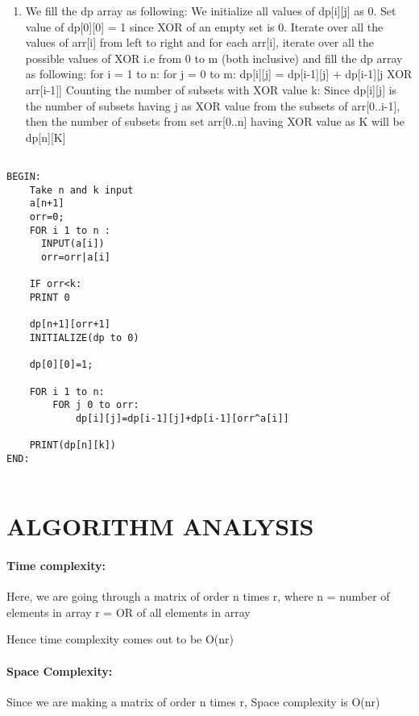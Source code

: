 \documentclass[10pt]{article}
\begin{document}
\begin{multicols*}{2}
\begin{enumerate}
\item	We fill the dp array as following:
We initialize all values of dp[i][j] as 0.
Set value of dp[0][0] = 1 since XOR of an empty set is 0.
Iterate over all the values of arr[i] from left to right and for each arr[i], iterate over all the possible values of XOR i.e from 0 to m (both inclusive) and fill the dp array as following:
   	for i = 1 to n:
             for j = 0 to m:
                   dp[i][j] = dp[i­-1][j] + dp[i­-1][j XOR arr[i-1]]
Counting the number of subsets with XOR value k: Since dp[i][j] is the number of subsets having j as XOR value from the subsets of arr[0..i-1], then the number of subsets from set arr[0..n] having XOR value as K will be dp[n][K]


\end{enumerate}



\begin{lstlisting}
        
BEGIN:
	Take n and k input
	a[n+1]
	orr=0;
	FOR i 1 to n :
      INPUT(a[i])
      orr=orr|a[i]

	IF orr<k:
  	PRINT 0
  	
    dp[n+1][orr+1]
    INITIALIZE(dp to 0)
	
    dp[0][0]=1;
	
	FOR i 1 to n:
    	FOR j 0 to orr:
            dp[i][j]=dp[i-1][j]+dp[i-1][orr^a[i]]
           
    PRINT(dp[n][k])
END:


\end{lstlisting}
    

	
\section*{ALGORITHM ANALYSIS} 


\paragraph{Time complexity:} Here, we are going through a matrix of order n times r, where
	n = number of elements in array
r = OR of all elements in array 

Hence time complexity comes out to be O(nr)
\\

\paragraph{Space Complexity:} Since we are making a matrix of order n times r,
Space complexity is O(nr)
\\\\


\end{multicols*}
\end{document}
